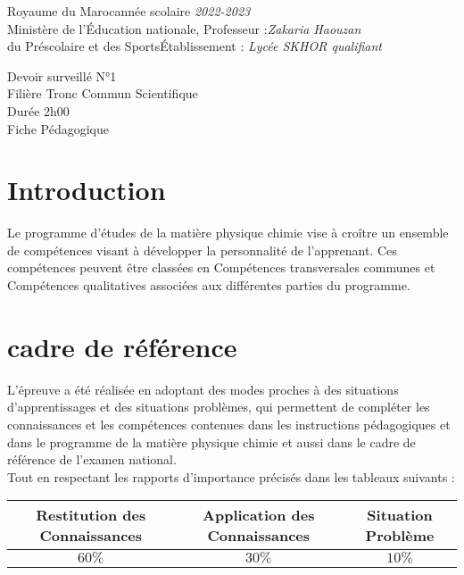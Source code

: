 \documentclass[12pt]{article}
\newcommand\headerMe[2]{\noindent{}#1\hfill#2}
\begin{document}
\headerMe{Royaume du Maroc}{année scolaire \emph{2022-2023}}\\
\headerMe{Ministère de l'Éducation nationale, }{  Professeur :\emph{Zakaria Haouzan}}\\
\headerMe{du Préscolaire et des Sports}{Établissement : \emph{Lycée SKHOR qualifiant}}\\

\begin{center}
Devoir surveillé N°1 \\
 Filière Tronc Commun Scientifique \\
Durée 2h00
\\
    \vspace{.2cm}
\hrulefill
\Large{Fiche Pédagogique}
\hrulefill\\
\end{center}


\section[A]{Introduction }
\hspace{0.5cm}Le programme d'études de la matière physique chimie vise à croître un ensemble de compétences visant à développer la personnalité de l'apprenant. Ces compétences peuvent être classées en Compétences transversales communes et Compétences qualitatives associées aux différentes parties du programme.
\section{cadre de référence }
 \hspace{0.5cm}L'épreuve a été réalisée en adoptant des modes proches à des situations d'apprentissages et des situations problèmes, qui permettent de compléter les connaissances et les compétences contenues dans les instructions pédagogiques et dans le programme de la matière physique chimie et aussi dans le cadre de référence de l'examen national. 
 \\Tout en respectant les rapports d'importance précisés dans les tableaux suivants :
 \begin{center}
\begin{tabular}{|c||c||c|}
\hline
    \textbf{Restitution des Connaissances} & \textbf{Application des Connaissances} & \textbf{Situation Problème }\\
    \hline
    $60\%$ & $30\%$ & $10\%$\\
    \hline
\end{tabular} 
\end{center}
\end{document}
